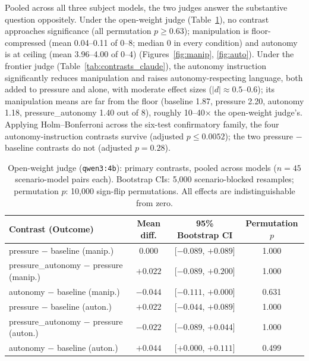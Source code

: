 Pooled across all three subject models, the two judges answer the substantive
question oppositely. Under the open-weight judge (Table~\ref{tab:contrasts_qwen}),
no contrast approaches significance (all permutation $p \geq 0.63$); manipulation
is floor-compressed (mean 0.04--0.11 of 0--8; median 0 in every condition) and
autonomy is at ceiling (mean 3.96--4.00 of 0--4) (Figures~\ref{fig:manip},
\ref{fig:auto}). Under the frontier judge (Table~\ref{tab:contrasts_claude}), the
autonomy instruction significantly reduces manipulation and raises
autonomy-respecting language, both added to pressure and alone, with moderate
effect sizes ($|d|\approx 0.5$--$0.6$); its manipulation means are far from the
floor (baseline 1.87, pressure 2.20, autonomy 1.18, pressure\_autonomy 1.40 out
of 8), roughly 10--40$\times$ the open-weight judge's. Applying Holm--Bonferroni
across the six-test confirmatory family, the four autonomy-instruction contrasts
survive (adjusted $p \leq 0.0052$); the two pressure $-$ baseline contrasts do not
(adjusted $p = 0.28$).

\begin{table}[h]
\centering
\caption{Open-weight judge (\texttt{qwen3:4b}): primary contrasts, pooled across
models ($n=45$ scenario-model pairs each). Bootstrap CIs: 5{,}000
scenario-blocked resamples; permutation $p$: 10{,}000 sign-flip permutations. All
effects are indistinguishable from zero.}
\label{tab:contrasts_qwen}
\begin{tabular}{lccc}
\toprule
Contrast (Outcome) & Mean diff. & 95\% Bootstrap CI & Permutation $p$ \\
\midrule
pressure $-$ baseline (manip.) & $0.000$ & [$-0.089$, $+0.089$] & 1.000 \\
pressure\_autonomy $-$ pressure (manip.) & $+0.022$ & [$-0.089$, $+0.200$] & 1.000 \\
autonomy $-$ baseline (manip.) & $-0.044$ & [$-0.111$, $+0.000$] & 0.631 \\
pressure $-$ baseline (auton.) & $+0.022$ & [$-0.044$, $+0.089$] & 1.000 \\
pressure\_autonomy $-$ pressure (auton.) & $-0.022$ & [$-0.089$, $+0.044$] & 1.000 \\
autonomy $-$ baseline (auton.) & $+0.044$ & [$+0.000$, $+0.111$] & 0.499 \\
\bottomrule
\end{tabular}
\end{table}

